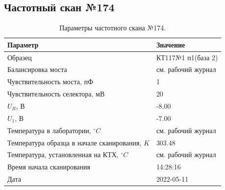 \subsection{Частотный скан №174}
\begin{table}[!ht]
    \centering
    \caption{Параметры частотного скана №174.}
    \begin{tabular}{|l|l|}
        \hline
        Параметр                                       & Значение                  \\ \hline
        Образец                                        & КТ117№1 п1(база 2)        \\ \hline
        Балансировка моста                             & см. рабочий журнал        \\ \hline
        Чувствительность моста, пФ                     & 1                         \\ \hline
        Чувствительность селектора, мВ                 & 20                        \\ \hline
        $U_R$, В                                       & -8.00                     \\ \hline
        $U_1$, В                                       & -7.00                     \\ \hline
        Температура в лаборатории, $^\circ C$          & см. рабочий журнал        \\ \hline
        Температура образца в начале сканирования, $K$ & 303.48                    \\ \hline
        Температура, установленная на КТХ, $^\circ C$  & см. рабочий журнал        \\ \hline
        Время начала сканирования                      & 14:28:16                  \\ \hline
        Дата                                           & 2022-05-11                \\ \hline
    \end{tabular}
    \label{table:frequency_scan_174}
\end{table}

